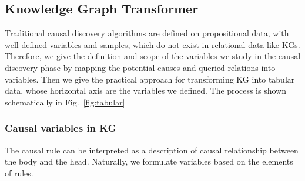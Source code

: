 \subsection{Knowledge Graph Transformer}
\label{sec:tabularnizar}
Traditional causal discovery algorithms are defined on propositional data, with well-defined variables and samples, which do not exist in relational data like KGs.
Therefore, we give the definition and scope of the variables we study in the causal discovery phase by mapping the potential causes and queried relations into variables.
Then we give the practical approach for transforming KG into tabular data, whose horizontal axis are the variables we defined.
The process is shown schematically in Fig.~\ref{fig:tabular}



\subsubsection{Causal variables in KG}
The causal rule can be interpreted as a description of causal relationship between the body and the head.
Naturally, we formulate variables based on the elements of rules.


